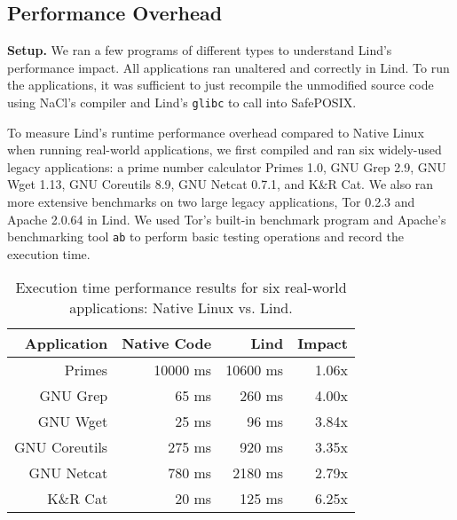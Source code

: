 {{{\subsection{Performance Overhead}
\label{Performance-Evaluation}


\noindent
\textbf{Setup.}
We ran a few programs of different types to understand Lind's performance 
impact.  All applications ran unaltered and correctly in Lind. To run the 
applications, it was sufficient to just recompile the unmodified
source code using NaCl's compiler and Lind's \texttt{glibc} to call
into SafePOSIX.

To measure Lind's runtime performance overhead compared to Native Linux
 when running real-world applications,
we first compiled and ran six widely-used legacy applications:
a prime number calculator Primes 1.0,
GNU Grep 2.9, GNU Wget 1.13, GNU Coreutils 8.9,
GNU Netcat 0.7.1, and K\&R Cat. 
We also ran more extensive benchmarks on two large legacy applications, 
Tor 0.2.3 and Apache 2.0.64 in Lind.
We used Tor's built-in benchmark program and Apache's benchmarking tool 
\texttt{ab} to perform basic testing operations and record the execution time.

\begin{table}
\centering
\scriptsize
\begin{tabular}{|r|r|r|r|}
  \hline
  {\bf Application} & {\bf Native Code} & {\bf Lind} & {\bf Impact}  \\
  \hline
  Primes & 10000 ms & 10600 ms & 1.06x \\
  GNU Grep & 65 ms & 260 ms & 4.00x \\
  GNU Wget & 25 ms & 96 ms & 3.84x \\
  GNU Coreutils & 275 ms & 920 ms & 3.35x \\
  GNU Netcat & 780 ms & 2180 ms & 2.79x \\
  K\&R Cat & 20 ms & 125 ms & 6.25x \\
  \hline
\end{tabular}
\caption{\small Execution time performance results for six real-world applications: Native
Linux vs. Lind.}
\label{table:performance_apps}
\end{table}

}}}
